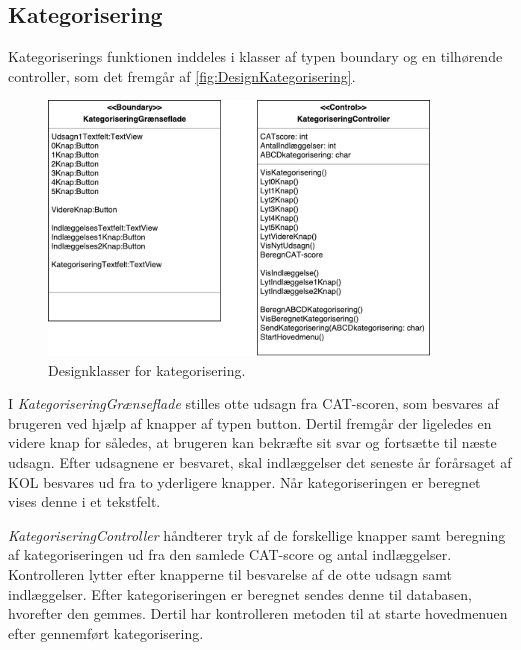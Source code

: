 \subsection*{Kategorisering}
Kategoriserings funktionen inddeles i klasser af typen boundary og en tilhørende controller, som det fremgår af \autoref{fig:DesignKategorisering}.

\begin{figure} [H]
\centering
\includegraphics[width=0.9\textwidth]{figures/MVC/MVCKategorisering}
\caption{Designklasser for kategorisering.}
\label{fig:DesignKategorisering}
\end{figure}

\noindent
I \textit{KategoriseringGrænseflade} stilles otte udsagn fra CAT-scoren, som besvares af brugeren ved hjælp af knapper af typen button. Dertil fremgår der ligeledes en videre knap for således, at brugeren kan bekræfte sit svar og fortsætte til næste udsagn. Efter udsagnene er besvaret, skal indlæggelser det seneste år forårsaget af KOL besvares ud fra to yderligere knapper. Når kategoriseringen er beregnet vises denne i et tekstfelt. 

\textit{KategoriseringController} håndterer tryk af de forskellige knapper samt beregning af kategoriseringen ud fra den samlede CAT-score og antal indlæggelser. Kontrolleren lytter efter knapperne til besvarelse af de otte udsagn samt indlæggelser. Efter kategoriseringen er beregnet sendes denne til databasen, hvorefter den gemmes. Dertil har kontrolleren metoden til at starte hovedmenuen efter gennemført kategorisering.  